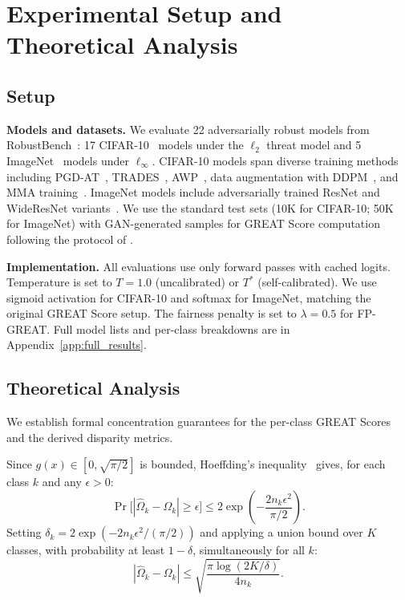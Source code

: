\section{Experimental Setup and Theoretical Analysis}
\label{sec:exp_setup_theory}

\subsection{Setup}
\label{sec:exp_setup}

\textbf{Models and datasets.} We evaluate 22 adversarially robust models from RobustBench~\citep{croce2021robustbenchstandardizedadversarialrobustness}: 17 CIFAR-10~\citep{krizhevsky2009learning} models under the $\ell_2$ threat model and 5 ImageNet~\citep{russakovsky2015imagenet} models under $\ell_\infty$. CIFAR-10 models span diverse training methods including PGD-AT~\citep{madry2019deeplearningmodelsresistant}, TRADES~\citep{zhang2019trades}, AWP~\citep{wu2020adversarial}, data augmentation with DDPM~\citep{rebuffi2021fixing}, and MMA training~\citep{ding2020mma}. ImageNet models include adversarially trained ResNet and WideResNet variants~\citep{salman2020provablyrobustdeeplearning, wong2020fast}. We use the standard test sets (10K for CIFAR-10; 50K for ImageNet) with GAN-generated samples for GREAT Score computation following the protocol of \citet{li2024greatscoreglobalrobustness}.

\textbf{Implementation.} All evaluations use only forward passes with cached logits. Temperature is set to $T=1.0$ (uncalibrated) or $T^*$ (self-calibrated). We use sigmoid activation for CIFAR-10 and softmax for ImageNet, matching the original GREAT Score setup. The fairness penalty is set to $\lambda = 0.5$ for FP-GREAT. Full model lists and per-class breakdowns are in Appendix~\ref{app:full_results}.

\subsection{Theoretical Analysis}
\label{sec:theoretical}

We establish formal concentration guarantees for the per-class GREAT Scores and the derived disparity metrics.

\begin{proposition}
\label{prop:per_class_concentration}
Since $g(x) \in [0, \sqrt{\pi/2}]$ is bounded, Hoeffding's inequality~\citep{Hoeffding1963-sq} gives, for each class $k$ and any $\epsilon > 0$:
\begin{equation}
    \Pr\bigl[|\hat{\Omega}_k - \Omega_k| \geq \epsilon\bigr] \leq 2\exp\!\left(-\frac{2 n_k \epsilon^2}{\pi/2}\right).
    \label{eq:hoeffding_class}
\end{equation}
Setting $\delta_k = 2\exp(-2n_k\epsilon^2 / (\pi/2))$ and applying a union bound over $K$ classes, with probability at least $1 - \delta$, simultaneously for all $k$:
\begin{equation}
    |\hat{\Omega}_k - \Omega_k| \leq \sqrt{\frac{\pi \log(2K/\delta)}{4 n_k}}.
    \label{eq:concentration_all}
\end{equation}
\end{proposition}

